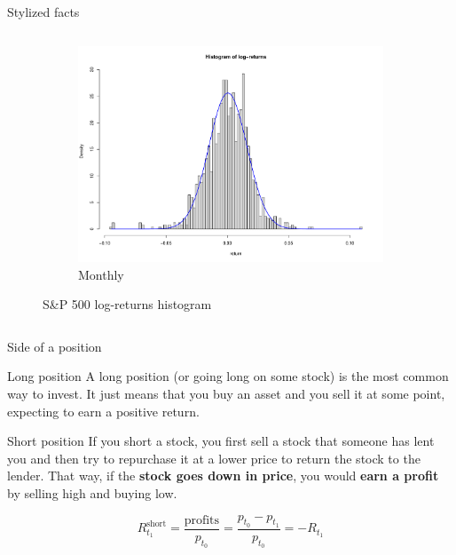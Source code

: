 \documentclass{beamer} %
\begin{document}
\begin{frame}{Stylized facts}
\begin{columns}
\begin{column}{.5\textwidth}
\begin{figure}[hbtp]
				\begin{subfigure}{\textwidth}
					\centering
					\includegraphics[scale=.11]
					{../Draft/img/finData/histMonthlyLogRet}
					\caption{Monthly}
				\end{subfigure}
				\caption{S\&P 500 log-returns histogram}

			\end{figure}
		\end{column}
	\end{columns}

\end{frame}

\begin{frame}{Side of a position}

\begin{block}{Long position}
A long position (or going long on some stock) is the most common way to 
invest. It just means that you buy an asset and you sell it at some point, 
expecting to earn a positive return.
\end{block}

\begin{block}{Short position}
If you short a stock, you first sell a stock that someone has lent you and 
then try to repurchase it at a lower price to return the stock to the lender. 
That way, if the \textbf{stock goes down in price}, you would \textbf{earn a 
profit} by selling high and buying low.
\end{block}

\begin{equation*}
	R_{t_1}^{\text{short}} = \frac{\text{profits}}{p_{t_0}} = \frac{p_{t_0} - 
	p_{t_1}}{p_{t_0}} = -R_{t_1}
\end{equation*}

\end{frame}
\end{document}
